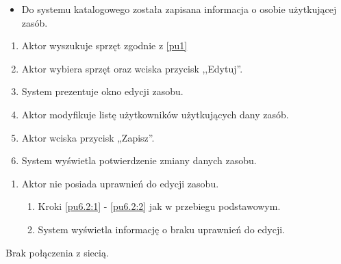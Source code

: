 \begin{itemize}
\item Do systemu katalogowego została zapisana informacja o osobie użytkującej zasób.
\end{itemize}

\begin{enumerate}
	\item \label{pu6.2:1} Aktor wyszukuje sprzęt zgodnie z \ref{pu1}
	\item \label{pu6.2:2} Aktor wybiera sprzęt oraz wciska przycisk ,,Edytuj''.
	\item System prezentuje okno edycji zasobu.
	\item Aktor modyfikuje listę użytkowników użytkujących dany zasób.
	\item Aktor wciska przycisk „Zapisz”.
	\item System wyświetla potwierdzenie zmiany danych zasobu.
\end{enumerate}

\begin{enumerate}
	\item Aktor nie posiada uprawnień do edycji zasobu.
	\begin{enumerate}[label*=\arabic*.]
		\item Kroki \ref{pu6.2:1} - \ref{pu6.2:2} jak w przebiegu podstawowym.
		\item System wyświetla informację o braku uprawnień do edycji.
	\end{enumerate}
\end{enumerate}

Brak połączenia z siecią.


